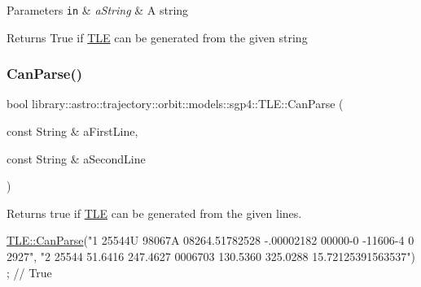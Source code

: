 \begin{DoxyParams}[1]{Parameters}
\mbox{\tt in}  & {\em a\+String} & A string \\
\hline
\end{DoxyParams}
\begin{DoxyReturn}{Returns}
True if \hyperlink{classlibrary_1_1astro_1_1trajectory_1_1orbit_1_1models_1_1sgp4_1_1_t_l_e}{T\+LE} can be generated from the given string 
\end{DoxyReturn}
\mbox{\label{classlibrary_1_1astro_1_1trajectory_1_1orbit_1_1models_1_1sgp4_1_1_t_l_e_a402cf951360912e70b167bc335c4f9a3}} 
\subsubsection{\texorpdfstring{Can\+Parse()}{CanParse()}\hspace{0.1cm}{\footnotesize\ttfamily [2/2]}}
{\footnotesize\ttfamily bool library\+::astro\+::trajectory\+::orbit\+::models\+::sgp4\+::\+T\+L\+E\+::\+Can\+Parse (\begin{DoxyParamCaption}\item[{const String \&}]{a\+First\+Line,  }\item[{const String \&}]{a\+Second\+Line }\end{DoxyParamCaption})\hspace{0.3cm}{\ttfamily [static]}}



Returns true if \hyperlink{classlibrary_1_1astro_1_1trajectory_1_1orbit_1_1models_1_1sgp4_1_1_t_l_e}{T\+LE} can be generated from the given lines. 


\begin{DoxyCode}
\hyperlink{classlibrary_1_1astro_1_1trajectory_1_1orbit_1_1models_1_1sgp4_1_1_t_l_e_a25d768ff21d590d34cd20d4101e07840}{TLE::CanParse}(\textcolor{stringliteral}{"1 25544U 98067A   08264.51782528 -.00002182  00000-0 -11606-4 0  2927"},
              \textcolor{stringliteral}{"2 25544  51.6416 247.4627 0006703 130.5360 325.0288 15.72125391563537"}) ; \textcolor{comment}{// True}
\end{DoxyCode}




